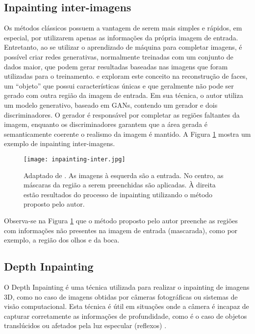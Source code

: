 \subsection{Inpainting inter-imagens} \label{inpainting-intra}

Os métodos clássicos possuem a vantagem de serem mais simples e rápidos, em especial, por utilizarem apenas as informações da própria imagem de entrada. Entretanto, ao se utilizar o aprendizado de máquina para completar imagens, é possível criar redes generativas, normalmente treinadas com um conjunto de dados maior, que podem gerar resultadas baseadas nas imagens que foram utilizadas para o treinamento.
\cite{li2017generative} e \cite{liao2018face} exploram este conceito na reconstrução de faces, um ``objeto'' que possui características únicas e que geralmente não pode ser gerado com outra região da imagem de entrada. Em sua técnica, \cite{li2017generative} o autor utiliza um modelo generativo, baseado em GANs, contendo um gerador e dois discriminadores. O gerador é responsável por completar as regiões faltantes da imagem, enquanto os discriminadores garantem que a área gerada é semanticamente coerente o realismo da imagem é mantido. A Figura \ref{fig:inpainting-inter} mostra um exemplo de inpainting inter-imagens.

\begin{figure}[ht]
\centering
\texttt{[image: inpainting-inter.jpg]}
\caption{Adaptado de \cite{li2017generative}. As imagens à esquerda são a entrada. No centro, as máscaras da região a serem preenchidas são aplicadas. À direita estão resultados do processo de inpainting utilizando o método proposto pelo autor.}
\label{fig:inpainting-inter}
\end{figure}

Observa-se na Figura \ref{fig:inpainting-inter} que o método proposto pelo autor preenche as regiões com informações não presentes na imagem de entrada (mascarada), como por exemplo, a região dos olhos e da boca. 


\subsection{Depth Inpainting} \label{quality-depth}
O Depth Inpainting é uma técnica utilizada para realizar o inpainting de imagens 3D, como no caso de imagens obtidas por câmeras fotográficas ou sistemas de visão computacional. Esta técnica é útil em situações onde a câmera é incapaz de capturar corretamente as informações de profundidade, como é o caso de objetos translúcidos ou afetados pela luz especular (reflexos) \cite{shish20203dphoto}. 

